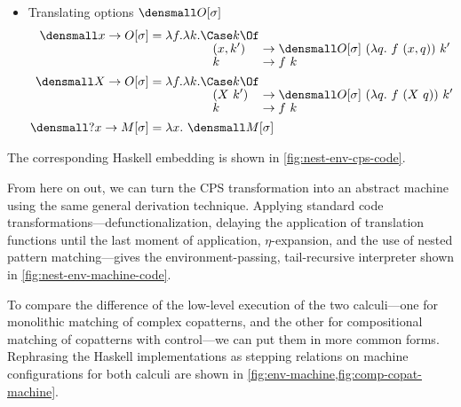 \begin{itemize}
\item Translating options $\den{O}[\sigma]$
  \begin{align*}
  \den{x \to O}[\sigma]
  &=
  \lambda f. \lambda k.
  \begin{alignedat}[t]{2}
    &\Case k \Of
    \\[-1ex]
    &\quad
    (x, k') &&\to \den{O}[\sigma] ~ (\lambda q.~ f~(x, q)) ~ k'
    \\[-1ex]
    &\quad
    k &&\to f ~ k
  \end{alignedat}
  \\
  \den{X \to O}[\sigma]
  &=
  \lambda f. \lambda k.
  \begin{alignedat}[t]{2}
    &\Case k \Of
    \\[-1ex]
    &\quad
    (X~k') &&\to \den{O}[\sigma] ~ (\lambda q.~ f~(X~q)) ~ k'
    \\[-1ex]
    &\quad
    k &&\to f ~ k
  \end{alignedat}
  \\
  \den{\ask x \to M}[\sigma] &= \lambda x.~ \den{M}[\sigma]
\end{align*}
\end{itemize}
The corresponding Haskell embedding is shown in \cref{fig:nest-env-cps-code}.

From here on out, we can turn the CPS transformation into an abstract machine
using the same general derivation technique.  Applying standard code
transformations---defunctionalization, delaying the application of translation
functions until the last moment of application, $\eta$-expansion, and the use of
nested pattern matching---gives the environment-passing, tail-recursive
interpreter shown in \cref{fig:nest-env-machine-code}.

To compare the difference of the low-level execution of the two calculi---one
for monolithic matching of complex copatterns, and the other for compositional
matching of copatterns with control---we can put them in more common forms.
Rephrasing the Haskell implementations as stepping relations on machine
configurations for both calculi are shown in
\cref{fig:env-machine,fig:comp-copat-machine}.

